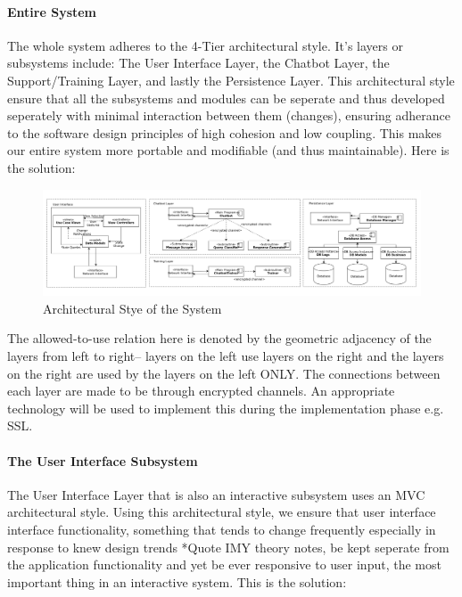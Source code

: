 \documentclass[11pt]{article}
\begin{document}
\paragraph{Entire System}
The whole system adheres to the 4-Tier architectural style. It's layers or subsystems include: The User Interface Layer, the Chatbot Layer, the Support/Training Layer, and lastly the Persistence Layer. This architectural style ensure that all the subsystems and modules can be seperate and thus developed seperately with minimal interaction between them (changes), ensuring adherance to the software design principles of high cohesion and low coupling\cite{Book:2}. This makes our entire system more portable and modifiable (and thus maintainable). Here is the solution:

\begin{figure}[H]
	\centering
	\hspace*{-2.1cm}\includegraphics[width=1.25\textwidth]{../../images/Botic_Layered_Architecture.png}
	\caption{Architectural Stye of the System}
\end{figure}

The allowed-to-use relation here is denoted by the geometric adjacency of the layers from left to right-- layers on the left use layers on the right and the layers on the right are used by the layers on the left ONLY. The connections between each layer are made to be through encrypted channels. An appropriate technology will be used to implement this during the implementation phase e.g. SSL.

\paragraph{The User Interface Subsystem}
The User Interface Layer that is also an interactive subsystem uses an MVC architectural style. Using this architectural style, we ensure that user interface interface functionality, something that tends to change frequently especially in response to knew design trends *Quote IMY theory notes, be kept seperate from the application functionality and yet be ever responsive to user input, the most important thing in an interactive system\cite{Book:2}. This is the solution:
\end{document}
